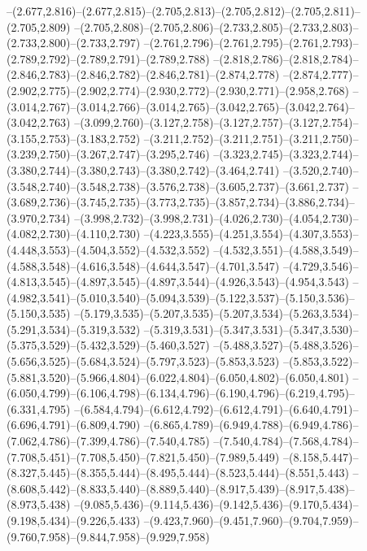   --(2.677,2.816)--(2.677,2.815)--(2.705,2.813)--(2.705,2.812)--(2.705,2.811)--(2.705,2.809)%
  --(2.705,2.808)--(2.705,2.806)--(2.733,2.805)--(2.733,2.803)--(2.733,2.800)--(2.733,2.797)%
  --(2.761,2.796)--(2.761,2.795)--(2.761,2.793)--(2.789,2.792)--(2.789,2.791)--(2.789,2.788)%
  --(2.818,2.786)--(2.818,2.784)--(2.846,2.783)--(2.846,2.782)--(2.846,2.781)--(2.874,2.778)%
  --(2.874,2.777)--(2.902,2.775)--(2.902,2.774)--(2.930,2.772)--(2.930,2.771)--(2.958,2.768)%
  --(3.014,2.767)--(3.014,2.766)--(3.014,2.765)--(3.042,2.765)--(3.042,2.764)--(3.042,2.763)%
  --(3.099,2.760)--(3.127,2.758)--(3.127,2.757)--(3.127,2.754)--(3.155,2.753)--(3.183,2.752)%
  --(3.211,2.752)--(3.211,2.751)--(3.211,2.750)--(3.239,2.750)--(3.267,2.747)--(3.295,2.746)%
  --(3.323,2.745)--(3.323,2.744)--(3.380,2.744)--(3.380,2.743)--(3.380,2.742)--(3.464,2.741)%
  --(3.520,2.740)--(3.548,2.740)--(3.548,2.738)--(3.576,2.738)--(3.605,2.737)--(3.661,2.737)%
  --(3.689,2.736)--(3.745,2.735)--(3.773,2.735)--(3.857,2.734)--(3.886,2.734)--(3.970,2.734)%
  --(3.998,2.732)--(3.998,2.731)--(4.026,2.730)--(4.054,2.730)--(4.082,2.730)--(4.110,2.730)%
  --(4.223,3.555)--(4.251,3.554)--(4.307,3.553)--(4.448,3.553)--(4.504,3.552)--(4.532,3.552)%
  --(4.532,3.551)--(4.588,3.549)--(4.588,3.548)--(4.616,3.548)--(4.644,3.547)--(4.701,3.547)%
  --(4.729,3.546)--(4.813,3.545)--(4.897,3.545)--(4.897,3.544)--(4.926,3.543)--(4.954,3.543)%
  --(4.982,3.541)--(5.010,3.540)--(5.094,3.539)--(5.122,3.537)--(5.150,3.536)--(5.150,3.535)%
  --(5.179,3.535)--(5.207,3.535)--(5.207,3.534)--(5.263,3.534)--(5.291,3.534)--(5.319,3.532)%
  --(5.319,3.531)--(5.347,3.531)--(5.347,3.530)--(5.375,3.529)--(5.432,3.529)--(5.460,3.527)%
  --(5.488,3.527)--(5.488,3.526)--(5.656,3.525)--(5.684,3.524)--(5.797,3.523)--(5.853,3.523)%
  --(5.853,3.522)--(5.881,3.520)--(5.966,4.804)--(6.022,4.804)--(6.050,4.802)--(6.050,4.801)%
  --(6.050,4.799)--(6.106,4.798)--(6.134,4.796)--(6.190,4.796)--(6.219,4.795)--(6.331,4.795)%
  --(6.584,4.794)--(6.612,4.792)--(6.612,4.791)--(6.640,4.791)--(6.696,4.791)--(6.809,4.790)%
  --(6.865,4.789)--(6.949,4.788)--(6.949,4.786)--(7.062,4.786)--(7.399,4.786)--(7.540,4.785)%
  --(7.540,4.784)--(7.568,4.784)--(7.708,5.451)--(7.708,5.450)--(7.821,5.450)--(7.989,5.449)%
  --(8.158,5.447)--(8.327,5.445)--(8.355,5.444)--(8.495,5.444)--(8.523,5.444)--(8.551,5.443)%
  --(8.608,5.442)--(8.833,5.440)--(8.889,5.440)--(8.917,5.439)--(8.917,5.438)--(8.973,5.438)%
  --(9.085,5.436)--(9.114,5.436)--(9.142,5.436)--(9.170,5.434)--(9.198,5.434)--(9.226,5.433)%
  --(9.423,7.960)--(9.451,7.960)--(9.704,7.959)--(9.760,7.958)--(9.844,7.958)--(9.929,7.958)%
